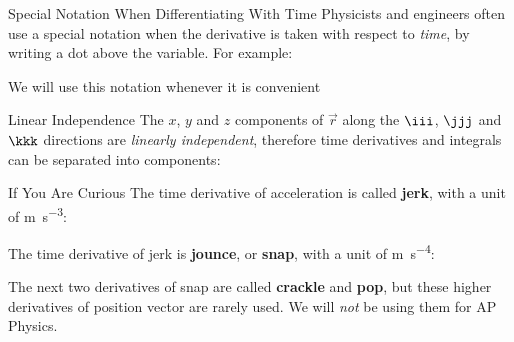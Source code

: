 \documentclass[12pt,compress,aspectratio=169,dvipsnames]{beamer}
\begin{document}
\begin{frame}{Special Notation When Differentiating With Time}
  Physicists and engineers often use a special notation when the derivative is
  taken with respect to \emph{time}, by writing a dot above the variable. For
  example:

  \vspace{-.3in}{\large
    \begin{align*}
      v &= \dot r \\
      a &= \dot v =\ddot r
    \end{align*}
  }

  We will use this notation whenever it is convenient
\end{frame}


\begin{frame}{Linear Independence}
  The $x$, $y$ and $z$ components of $\vec r$ along the $\iii$, $\jjj$ and
  $\kkk$ directions are \emph{linearly independent}, therefore time
  derivatives and integrals can be separated into components:

\end{frame}



\begin{frame}{If You Are Curious}
  The time derivative of acceleration is called \textbf{jerk}, with a unit
  of \si{\metre\per\second\cubed}:


  The time derivative of jerk is \textbf{jounce}, or \textbf{snap}, with a
  unit of \si{\metre\per\second^4}:
  
  
  The next two derivatives of snap are called \textbf{crackle} and
  \textbf{pop}, but these higher derivatives of position vector are rarely used.
  We will \emph{not} be using them for AP Physics.
\end{frame}
\end{document}
